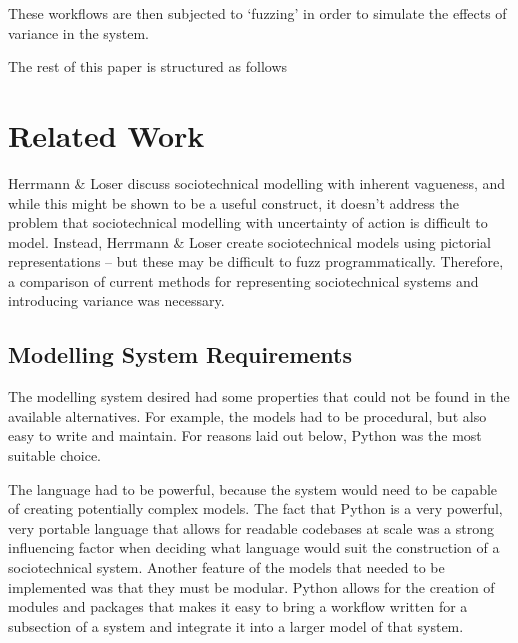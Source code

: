 \documentclass[11pt, twocolumn]{article}
\begin{document}
  These workflows are then subjected to
`fuzzing' in order to simulate the effects of variance in the system.

The rest of this paper is structured as follows


\section{Related Work}


\label{related_head}
Herrmann \& Loser\cite{Herrmann1999} discuss sociotechnical modelling with inherent vagueness, and while this might be shown to be a useful construct, it doesn't address the problem that sociotechnical modelling with uncertainty of action is difficult to model. Instead, Herrmann \& Loser create sociotechnical models using pictorial representations -- but these may be difficult to fuzz programmatically. Therefore, a comparison of current methods for representing sociotechnical systems and introducing variance was necessary. \par

\subsection{Modelling System Requirements}\label{planning_modelling_requirements}
The modelling system desired had some properties that could not be found in the available alternatives. For example, the models had to be procedural, but also easy to write and maintain. For reasons laid out below, Python was the most suitable choice. \par

The language had to be powerful, because the system would need to be capable of creating potentially complex models. The fact that Python is a very powerful, very portable language that allows for readable codebases at scale was a strong influencing factor when deciding what language would suit the construction of a sociotechnical system. Another feature of the models that needed to be implemented was that they must be modular. Python allows for the creation of modules and packages that makes it easy to bring a workflow written for a subsection of a system and integrate it into a larger model of that system. \par
\end{document}
